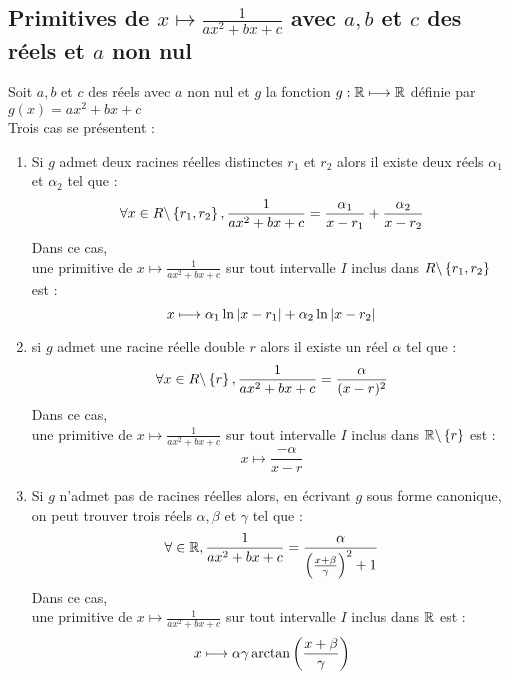 \subsection{Primitives de \(x\mapsto \frac{1}{ax^2+bx+c}\) avec \(a,b\) et \(c\) des réels et \(a\) non nul}
\begin{appl}
    Soit \(a,b\) et \(c\) des réels avec \(a\) non nul et \(g\) la fonction \(g:\mathbb{R} \longmapsto \mathbb{R}\) définie par \(g(x) = ax^2+bx+c\) \\
    Trois cas se présentent : 
    \begin{enumerate}
        \item Si \(g\) admet deux racines réelles distinctes \(r_1\) et \(r_2\) alors il existe deux réels \(\alpha_1\) et \(\alpha_2\) tel que :
        \[\forall x \in R\backslash\left\lbrace r_1,r_2\right\rbrace, \frac{1}{ax^2+bx+c} = \frac{\alpha_1}{x-r_1}+\frac{\alpha_2}{x-r_2}\]
        Dans ce cas, \\
        une primitive de \(x\mapsto \frac{1}{ax^2+bx+c}\) sur tout intervalle \(I\) inclus dans \(R\backslash\left\lbrace r_1,r_2\right\rbrace\) est :
        \[x\longmapsto \alpha_1 \ln\left\lvert x-r_1\right\rvert + \alpha_2\ln\left\lvert x-r_2\right\rvert\]


        \item si \(g\) admet une racine réelle double \(r\) alors il existe un réel \(\alpha\) tel que :
        \[\forall x \in R\backslash\left\lbrace r\right\rbrace, \frac{1}{ax^2+bx+c} = \frac{\alpha}{(x-r)^2}\]
        Dans ce cas,\\
        une primitive de \(x\mapsto \frac{1}{ax^2+bx+c}\) sur tout intervalle \(I\) inclus dans \(\mathbb{R}\backslash\left\lbrace r\right\rbrace\) est :
        \[x\mapsto \frac{-\alpha}{x-r}\]


        \item Si \(g\) n'admet pas de racines réelles alors, en écrivant \(g\) sous forme canonique, on peut trouver trois réels \(\alpha,\beta \) et \(\gamma\) tel que :
        \[\forall \in \mathbb{R}, \frac{1}{ax^2+bx+c} = \frac{\alpha}{\left(\frac{x+\beta}{\gamma}\right)^2+1}\]
        Dans ce cas,\\
        une primitive de \(x\mapsto \frac{1}{ax^2+bx+c}\) sur tout intervalle \(I\) inclus dans \(\mathbb{R}\) est :
        \[x\longmapsto \alpha \gamma \arctan\left(\frac{x+\beta}{\gamma}\right)\]
    \end{enumerate}
\end{appl}

